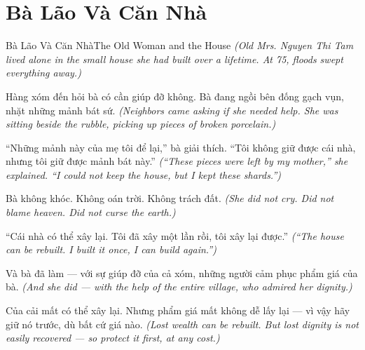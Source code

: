 \section{Bà Lão Và Căn Nhà}
\begin{truyen}{Bà Lão Và Căn Nhà}{The Old Woman and the House}
\textit{(Old Mrs. Nguyen Thi Tam lived alone in the small house she had built over a lifetime. At 75, floods swept everything away.)}

Hàng xóm đến hỏi bà có cần giúp đỡ không. Bà đang ngồi bên đống gạch vụn, nhặt những mảnh bát sứ.
\textit{(Neighbors came asking if she needed help. She was sitting beside the rubble, picking up pieces of broken porcelain.)}

``Những mảnh này của mẹ tôi để lại,'' bà giải thích. ``Tôi không giữ được cái nhà, nhưng tôi giữ được mảnh bát này.''
\textit{(``These pieces were left by my mother,'' she explained. ``I could not keep the house, but I kept these shards.'')}

Bà không khóc. Không oán trời. Không trách đất.
\textit{(She did not cry. Did not blame heaven. Did not curse the earth.)}

``Cái nhà có thể xây lại. Tôi đã xây một lần rồi, tôi xây lại được.''
\textit{(``The house can be rebuilt. I built it once, I can build again.'')}

Và bà đã làm — với sự giúp đỡ của cả xóm, những người cảm phục phẩm giá của bà.
\textit{(And she did — with the help of the entire village, who admired her dignity.)}

\end{truyen}

\begin{baihoc}
Của cải mất có thể xây lại. Nhưng phẩm giá mất không dễ lấy lại — vì vậy hãy giữ nó trước, dù bất cứ giá nào.
\textit{(Lost wealth can be rebuilt. But lost dignity is not easily recovered — so protect it first, at any cost.)}
\end{baihoc}
\ngancach

